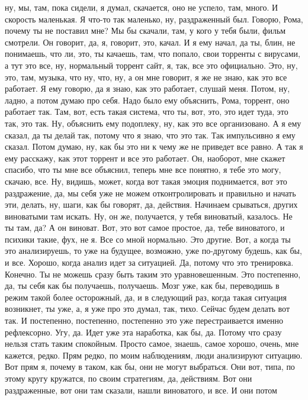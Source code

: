 ну, мы, там, пока сидели, я думал,
скачается, оно не успело, там, много.
И скорость маленькая. Я что-то так
маленько, ну, раздраженный
был. Говорю, Рома,
почему ты не поставил мне? Мы бы
скачали, там, у кого у тебя были,
фильм смотрели. Он говорит,
да, я, говорит, это, качал.
И я ему начал,
да ты, блин, не понимаешь, что ли,
это, ты качаешь, там, что попало,
свои торренты с вирусами, а тут
это все, ну,
нормальный торрент сайт, я, так,
все это официально. Это,
ну, это, там, музыка, что
ну, что,
ну, а он мне говорит, я же не знаю,
как это все работает. Я ему говорю, да я знаю,
как это работает, слушай меня.
Потом, ну, ладно, а потом
думаю про себя. Надо было ему
объяснить, Рома, торрент, оно работает
так. Там, вот, есть такая система,
что ты, вот, это, это идет туда,
это так, это так. Ну, объяснить ему
подоплеку, ну, как
это все организовано. А я ему сказал,
да ты делай так, потому что я знаю, что это
так. Так импульсивно
я ему сказал.
Потом думаю, ну, как бы это ни к чему
же не приведет все равно. А так я ему
расскажу, как этот торрент и все это
работает. Он, наоборот, мне скажет
спасибо, что ты мне все объяснил,
теперь мне все понятно, я тебе это могу,
скачаю, все.
Ну, видишь, может, когда вот такая эмоция
поднимается, вот это раздражение, да,
мы себя уже не можем отконтролировать
и правильно и начать эти, делать,
ну, шаги, как бы
говорят, да, действия.
Начинаем срываться, других виноватыми там искать.
Ну, он же, получается, у тебя виноватый,
казалось. Не ты там, да?
А он виноват.
Вот, это вот самое простое, да, тебе виноватого,
и психики такие, фух, не я.
Все со мной нормально.
Это другие.
Вот, а когда ты это анализируешь,
то уже на будущее, возможно, уже по-другому
будешь, как бы, и все.
Хорошо, когда анализ идет за
ситуацией. Да, потому что это тренировка.
Конечно. Ты не можешь сразу
быть таким это уравновешенным.
Это постепенно, да, ты себя
как бы получаешь, получаешь. Мозг
уже, как бы, переводишь
в режим такой более
осторожный, да,
и в следующий раз, когда такая ситуация
возникнет, ты уже, а, я уже про это
думал, так, тихо.
Сейчас будем делать вот так. И постепенно,
постепенно, постепенно это уже
перестраивается именно рефлексорно.
Угу, да. Идет уже
эта наработка, как бы, да.
Потому что сразу нельзя стать таким
спокойным. Просто самое, знаешь, самое
хорошо, очень, мне кажется, редко.
Прям редко, по моим наблюдениям,
люди анализируют
ситуацию. Вот прям
я, почему
в таком, как бы, они не могут
выбраться. Они вот, типа, по этому кругу
кружатся, по своим
стратегиям, да, действиям. Вот они
раздраженные, вот они там сказали,
нашли виноватого, и все. И они потом
